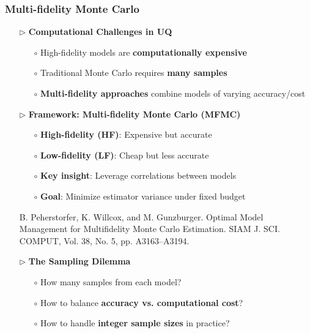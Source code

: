 \documentclass{beamer}
\begin{document}
\begin{frame}[t]
\frametitle{Multi-fidelity Monte Carlo}
\begin{itemize}[leftmargin=5pt] 

    \item[$\triangleright$] \textcolor{myblue3}{\bf Computational Challenges in UQ}
    \begin{itemize}[leftmargin=15pt] 
    \item[$\circ$] High-fidelity models are \textbf{computationally expensive}
    \item[$\circ$] Traditional Monte Carlo requires \textbf{many samples}
    \item[$\circ$] \textbf{Multi-fidelity approaches} combine models of varying accuracy/cost
    \end{itemize}
    
    \item[$\triangleright$] \textcolor{myblue3}{\bf Framework: Multi-fidelity Monte Carlo (MFMC)} 
    \begin{itemize}[leftmargin=15pt] 
    \item[$\circ$] \textbf{High-fidelity (HF)}: Expensive but accurate
    \item[$\circ$] \textbf{Low-fidelity (LF)}: Cheap but less accurate
    \item[$\circ$] \textbf{Key insight}: Leverage correlations between models
    \item[$\circ$] \textbf{Goal}: Minimize estimator variance under fixed budget
    \end{itemize}   
    \vspace{1mm}
    {\fontsize{8}{8}\selectfont \textcolor{mygray2}{B. Peherstorfer, K. Willcox, and M. Gunzburger. Optimal Model Management for Multifidelity Monte Carlo Estimation. SIAM J. SCI. COMPUT, Vol. 38, No. 5, pp. A3163–A3194.}\par}
    
    \item[$\triangleright$] \textcolor{myblue3}{\bf The Sampling Dilemma}
    \begin{itemize}[leftmargin=15pt] 
    \item[$\circ$] How many samples from each model?
    \item[$\circ$] How to balance \textbf{accuracy vs. computational cost}?
    \item[$\circ$] How to handle \textbf{integer sample sizes} in practice?
    \end{itemize}
    
\end{itemize}
\end{frame}
\end{document}
